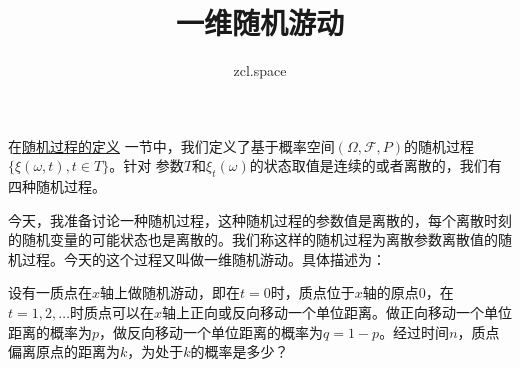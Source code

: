 \documentclass[10pt,a4paper,UTF8]{article}
\author{zcl.space}
\date{}
\title{一维随机游动}
\begin{document}
\maketitle
在\href{definition-of-stochastic-process.org}{随机过程的定义} 一节中，我们定义了基于概率空间\((\Omega,\mathcal{F},P)\)的随机过程\(\{\xi(\omega,t),t\in T\}\)。针对 参数\(T\)和\(\xi_{t}(\omega)\)的状态取值是连续的或者离散的，我们有四种随机过程。

今天，我准备讨论一种随机过程，这种随机过程的参数值是离散的，每个离散时刻的随机变量的可能状态也是离散的。我们称这样的随机过程为离散参数离散值的随机过程。今天的这个过程又叫做一维随机游动。具体描述为：
\begin{problem}
设有一质点在\(x\)轴上做随机游动，即在\(t=0\)时，质点位于\(x\)轴的原点\(0\)，在\(t=1,2,\ldots\)时质点可以在\(x\)轴上正向或反向移动一个单位距离。做正向移动一个单位距离的概率为\(p\)，做反向移动一个单位距离的概率为\(q = 1-p\)。经过时间\(n\)，质点偏离原点的距离为\(k\)，为处于\(k\)的概率是多少？
\end{problem}
\end{document}
